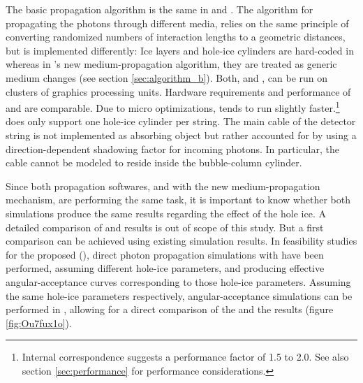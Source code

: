 The basic propagation algorithm is the same in \ppc and \clsim. The algorithm for propagating the photons through different media, relies on the same principle of converting randomized numbers of interaction lengths to a geometric distances, but is implemented differently: Ice layers and hole-ice cylinders are hard-coded in \ppc whereas in \clsim's new medium-propagation algorithm, they are treated as generic medium changes (see section \ref{sec:algorithm_b}). Both, \ppc and \clsim, can be run on clusters of graphics processing units. \cite{ppcpaper, ppcsource, ppcforhumans, clsimsource}
Hardware requirements and performance of \ppc and \clsim are comparable. Due to micro optimizations, \ppc tends to run slightly faster.\footnote{Internal correspondence suggests a performance factor of 1.5 to 2.0. See also section \ref{sec:performance} for performance considerations.}
\ppc does only support one hole-ice cylinder per string. The main cable of the detector string is not implemented as absorbing object but rather accounted for by using a direction-dependent shadowing factor for incoming photons. \cite{ppcsource, ppcforhumans}
In particular, the cable cannot be modeled to reside inside the bubble-column cylinder. \cite{martinspicehddard}

Since both propagation softwares, \ppc and \clsim with the new medium-propagation mechanism, are performing the same task, it is important to know whether both simulations produce the same results regarding the effect of the hole ice. A detailed comparison of \ppc and \clsim results is out of scope of this study. But a first comparison can be achieved using existing \ppc simulation results.\followup
In feasibility studies for the proposed  (), direct photon propagation simulations with \ppc have been performed, assuming different hole-ice parameters, and producing effective angular-acceptance curves corresponding to those hole-ice parameters. \cite{pocam, icrc17pocam}
Assuming the same hole-ice parameters respectively, angular-acceptance simulations can be performed in \clsim, allowing for a direct comparison of the \ppc and the \clsim results (figure \ref{fig:Ou7fux1o}).


